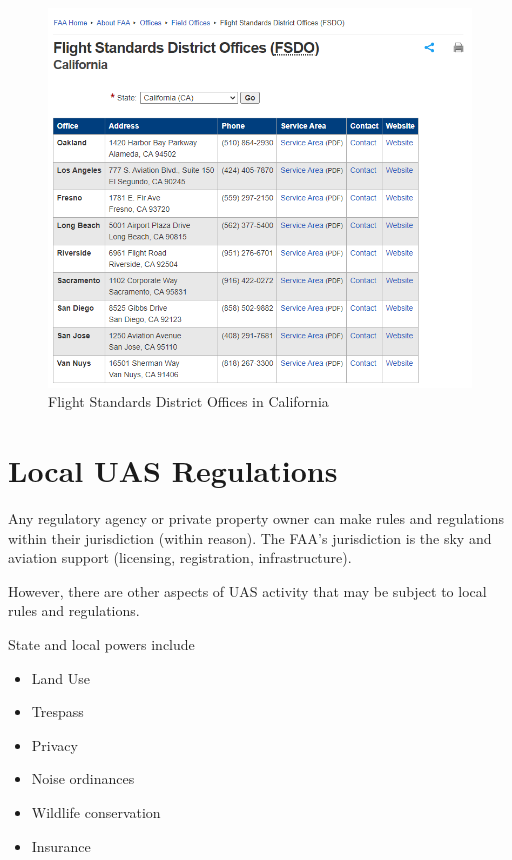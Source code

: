 \documentclass[
]{book}
\providecommand{\tightlist}{%
  \setlength{\itemsep}{0pt}\setlength{\parskip}{0pt}}
\begin{document}
\begin{figure}
\centering
\includegraphics{images/FAA_California_FSDO.png}
\caption{Flight Standards District Offices in California}
\end{figure}

\hypertarget{ch-local-UAS-regulations}{%
\chapter{Local UAS Regulations}\label{ch-local-UAS-regulations}}

Any regulatory agency or private property owner can make rules and regulations within their jurisdiction (within reason). The FAA's jurisdiction is the sky and aviation support (licensing, registration, infrastructure).

However, there are other aspects of UAS activity that may be subject to local rules and regulations.

State and local powers include

\begin{itemize}
\tightlist
\item
  Land Use
\item
  Trespass
\item
  Privacy
\item
  Noise ordinances
\item
  Wildlife conservation
\item
  Insurance
\end{itemize}
\end{document}
